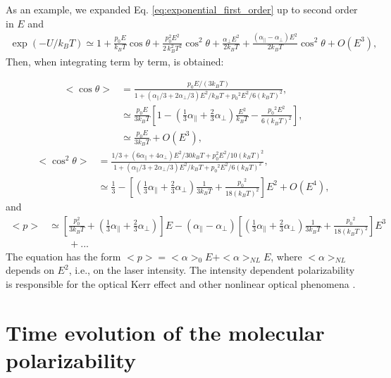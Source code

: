 \documentclass[12pt,letterpaper]{article}
\begin{document}
As an example, we expanded Eq. \eqref{eq:exponential_first_order} up to second order in $E$ and  
\begin{align}\label{eq:exponential_second_order}
  \exp(-U/k_BT)\simeq 1+\frac{p_0E}{k_BT}\cos\theta+ \frac{p_0^2E^2}{2\,k_B^2T^2}\cos^2\theta + \frac{\alpha_\bot E^2}{2k_BT} +
\frac{\left(\alpha_\parallel - \alpha_\bot\right) E^2}{2k_BT}\cos^2\theta+ O(E^3),
\end{align}
Then, when integrating term by term, is obtained:

\begin{subequations}\label{eq:statistics_second_order_cos}
 \begin{align}
  <\cos\theta>&=\frac{p_0E/(3k_BT)}{1+\left(\alpha_\parallel/3+2\alpha_\bot/3\right){E}^{2}/k_BT+{p_0}^{2}{E}^{2}/6(k_BT)^{2}},\\
  &\simeq \frac{p_0E}{3k_BT}\left[1-\left(\frac{1}{3}\alpha_\parallel+\frac{2}{3}\alpha_\bot\right)\frac{E^{2}}{k_BT}-\frac{{p_0}^{2}{E}^{2}}{6(k_BT)^{2}}\right],\\
  &\simeq \frac{p_0E}{3k_BT} + O(E^3),	
 \end{align}
\end{subequations}
\begin{subequations}\label{eq:statistics_second_order_cos_sqr}
 \begin{align}
  <\cos^2\theta>&=\frac{1/3 + \left(6\alpha_\parallel +4\alpha_\bot\right)E^2/30k_BT+p_0^2E^2/10(k_BT)^{2}}{1+\left(\alpha_\parallel/3+2\alpha_\bot/3\right){E}^{2}/k_BT+{p_0}^{2}{E}^{2}/6(k_BT)^{2}},\\
&\simeq \frac{1}{3} - \left[\left(\frac{1}{3}\alpha_\parallel+\frac{2}{3}\alpha_\bot\right)\frac{1}{3k_BT}+\frac{{p_0}^{2}}{18(k_BT)^{2}}\right]E^2 + O(E^4),
 \end{align}
\end{subequations}
and
\begin{align}\label{eq:total_pol_second_order}
 <p>&\simeq\left[\frac{p_0^2}{3k_BT}+\left(\frac{1}{3}\alpha_\parallel+\frac{2}{3}\alpha_\bot\right)\right]E - (\alpha_\parallel - \alpha_\bot)\left[\left(\frac{1}{3}\alpha_\parallel+\frac{2}{3}\alpha_\bot\right)\frac{1}{3k_BT}+\frac{{p_0}^{2}}{18(k_BT)^{2}}\right]E^3\nonumber\\ 
 &\qquad + ...
\end{align}
The equation has the form $<p>=<\alpha>_0E + <\alpha>_{NL}E$, where $<\alpha>_{NL}$ depends on $E^2$, i.e., on the laser intensity. The intensity dependent polarizability is responsible for the optical Kerr effect and other nonlinear optical phenomena \cite{boyd2008}.


\section{Time evolution of the molecular polarizability}\label{time}

 

\end{document}
